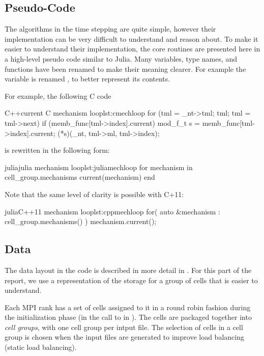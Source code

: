 \subsection{Pseudo-Code}
The algorithms in the time stepping are quite simple, however their implementation can be very difficult to understand and reason about. To make it easier to understand their implementation, the core routines are presented here in a high-level pseudo code similar to Julia. Many variables, type names, and functions have been renamed to make their meaning clearer. For example the variable  is renamed , to better represent its contents.

For example, the following C code
\begin{inlinelisting}{C++}{current C mechanism loop}{lst:cmechloop}
for (tml = _nt->tml; tml; tml = tml->next)
  if (memb_func[tml->index].current) {
    mod_f_t s = memb_func[tml->index].current;
    (*s)(_nt, tml->ml, tml->index);
  }
\end{inlinelisting}
\noindent is rewritten in the following form:
\begin{inlinelisting}{julia}{julia mechanism loop}{lst:juliamechloop}
for mechanism in cell_group.mechanisms
  current(mechanism)
end
\end{inlinelisting}

\noindent Note that the same level of clarity is possible with C+11:
\begin{inlinelisting}{julia}{C++11 mechanism loop}{lst:cppmechloop}
for( auto &mechanism : cell_group.mechanisms() ) {
  mechanism.current();
}
\end{inlinelisting}

\subsection{Data}
The data layout in the \neuron code is described in more detail in . For this part of the report, we use a representation of the storage for a group of cells that is easier to understand.

Each MPI rank has a set of cells assigned to it in a round robin fashion during the initialization phase (in the call to  in ).
The cells are packaged together into \emph{cell groups}, with one cell group per intput file. The selection of cells in a cell group is chosen when the input files are generated to improve load balancing (static load balancing).

